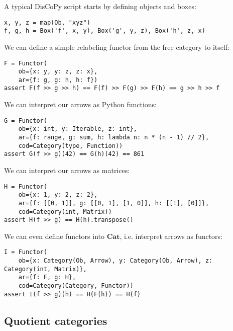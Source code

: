 \begin{example}
A typical DisCoPy script starts by defining objects and boxes:
\begin{verbatim}
x, y, z = map(Ob, "xyz")
f, g, h = Box('f', x, y), Box('g', y, z), Box('h', z, x)
\end{verbatim}
We can define a simple relabeling functor from the free category to itself:
\begin{verbatim}
F = Functor(
    ob={x: y, y: z, z: x},
    ar={f: g, g: h, h: f})
assert F(f >> g >> h) == F(f) >> F(g) >> F(h) == g >> h >> f
\end{verbatim}
We can interpret our arrows as Python functions:
\begin{verbatim}
G = Functor(
    ob={x: int, y: Iterable, z: int},
    ar={f: range, g: sum, h: lambda n: n * (n - 1) // 2},
    cod=Category(type, Function))
assert G(f >> g)(42) == G(h)(42) == 861
\end{verbatim}
We can interpret our arrows as matrices:
\begin{verbatim}
H = Functor(
    ob={x: 1, y: 2, z: 2},
    ar={f: [[0, 1]], g: [[0, 1], [1, 0]], h: [[1], [0]]},
    cod=Category(int, Matrix))
assert H(f >> g) == H(h).transpose()
\end{verbatim}
We can even define functors into $\mathbf{Cat}$, i.e. interpret arrows as functors:
\begin{verbatim}
I = Functor(
    ob={x: Category(Ob, Arrow), y: Category(Ob, Arrow), z: Category(int, Matrix)},
    ar={f: F, g: H},
    cod=Category(Category, Functor))
assert I(f >> g)(h) == H(F(h)) == H(f)
\end{verbatim}
\end{example}

\subsection{Quotient categories}\label{subsection:quotient-categories}

